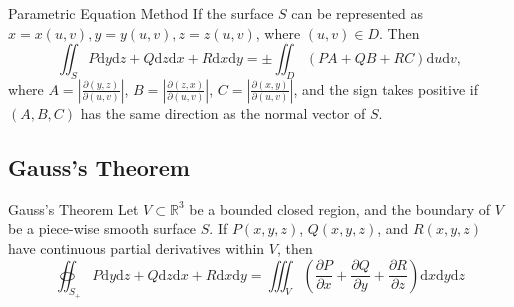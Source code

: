 \begin{proposition}{Parametric Equation Method}{}
  If the surface $S$ can be represented as $x = x(u,v), y = y(u,v), z = z(u,v)$,
  where $(u,v) \in D$. Then
  \begin{equation}
    \iint_S P\mathrm{d}y\mathrm{d}z + Q\mathrm{d}z\mathrm{d}x + R\mathrm{d}x\mathrm{d}y
    = \pm \iint_D (PA + QB + RC)\mathrm{d}u\mathrm{d}v,
  \end{equation}
  where $A = |\frac{\partial(y,z)}{\partial(u,v)}|$, $B =
  |\frac{\partial(z,x)}{\partial(u,v)}|$, $C = |\frac{\partial(x,y)}{\partial(u,v)}|$,
  and the sign takes positive if $(A, B, C)$ has the same direction as the
  normal vector of $S$.
\end{proposition}


\subsection{Gauss's Theorem}

\begin{theorem}{Gauss's Theorem}{}
  Let $V \subset \mathbb{R}^3$ be a bounded closed region, and the boundary of
  $V$ be a piece-wise smooth surface $S$. If $P(x,y,z)$, $Q(x,y,z)$, and $R(x,y,z)$ have continuous
  partial derivatives within $V$, then
  \begin{equation}
    \oiint _{S_+}P\mathrm{d}y \mathrm{d}z + Q \mathrm{d}z \mathrm{d}x + R \mathrm{d}x \mathrm{d}y = \iiint_V (\frac{\partial P}{\partial x} + \frac{\partial Q}{\partial y} + \frac{\partial R}{\partial z})\mathrm{d}x \mathrm{d}y \mathrm{d}z
  \end{equation}
\end{theorem}



